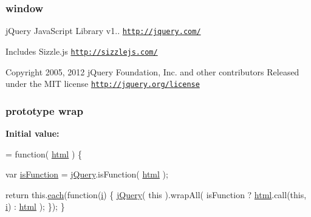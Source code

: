 \subsubsection[{window}]{\setlength{\rightskip}{0pt plus 5cm}window}\label{jquery-1_810_82-vsdoc_8js_a04a8a2bbfa9c15500892b8e5033d625b}
j\+Query Java\+Script Library v1.. \href{http://jquery.com/}{\tt http\+://jquery.\+com/}

Includes Sizzle.\+js \href{http://sizzlejs.com/}{\tt http\+://sizzlejs.\+com/}

Copyright 2005, 2012 j\+Query Foundation, Inc. and other contributors Released under the M\+I\+T license \href{http://jquery.org/license}{\tt http\+://jquery.\+org/license} \hypertarget{jquery-1_810_82-vsdoc_8js_a75991b1c3d71522ced1bf65ab3b07902}{}
\subsubsection[{wrap}]{ {\bf prototype} wrap}\label{jquery-1_810_82-vsdoc_8js_a75991b1c3d71522ced1bf65ab3b07902}
{\bfseries Initial value\+:}
\begin{DoxyCode}
= \textcolor{keyword}{function}( \hyperlink{jquery-1_810_82-vsdoc_8js_a54a716632718016dd4e400e83a0970e2}{html} ) \{


        var \hyperlink{jquery-1_810_82-vsdoc_8js_a02aa8413df0c687cbb1cd77943741d5a}{isFunction} = \hyperlink{jquery-1_810_82-vsdoc_8js_add5237586d970a38a81f990e8eb28c6c}{jQuery}.isFunction( \hyperlink{jquery-1_810_82-vsdoc_8js_a54a716632718016dd4e400e83a0970e2}{html} );

        \textcolor{keywordflow}{return} this.\hyperlink{jquery-1_810_82-vsdoc_8js_aae0bcb6b00035445a8f9b262c96ea8a2}{each}(\textcolor{keyword}{function}(\hyperlink{_bibabook_2_scripts_2respond_8min_8js_a5e25b1d1bed9ab5f3174b76d6a722180}{i}) \{
            \hyperlink{jquery-1_810_82-vsdoc_8js_add5237586d970a38a81f990e8eb28c6c}{jQuery}( \textcolor{keyword}{this} ).wrapAll( isFunction ? \hyperlink{jquery-1_810_82-vsdoc_8js_a54a716632718016dd4e400e83a0970e2}{html}.call(\textcolor{keyword}{this}, \hyperlink{_bibabook_2_scripts_2respond_8min_8js_a5e25b1d1bed9ab5f3174b76d6a722180}{i}) : 
      \hyperlink{jquery-1_810_82-vsdoc_8js_a54a716632718016dd4e400e83a0970e2}{html} );
        \});
    \}
\end{DoxyCode}
\hypertarget{jquery-1_810_82-vsdoc_8js_a2c353bb2917de8da2978e4b4dd73acb3}{}
